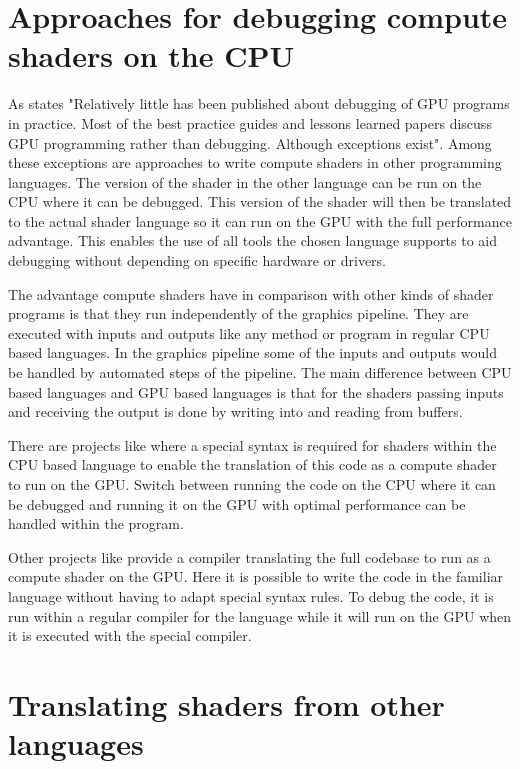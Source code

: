\section{Approaches for debugging compute shaders on the CPU}
\label{section:computeApproaches}

As  states "Relatively little has been published about debugging of GPU programs  in  practice.  Most  of  the  best  practice  guides  and lessons learned papers discuss GPU programming rather than debugging. Although exceptions exist". Among these exceptions are approaches to write compute shaders in other programming languages. The version of the shader in the other language can be run on the CPU where it can be debugged. This version of the shader will then be translated to the actual shader language so it can run on the GPU with the full performance advantage. This enables the use of all tools the chosen language supports to aid debugging without depending on specific hardware or drivers.

The advantage compute shaders have in comparison with other kinds of shader programs is that they run independently of the graphics pipeline. They are executed with inputs and outputs like any method or program in regular CPU based languages. In the graphics pipeline some of the inputs and outputs would be handled by automated steps of the pipeline. The main difference between CPU based languages and GPU based languages is that for the shaders passing inputs and receiving the output is done by writing into and reading from buffers.

There are projects like  where a special syntax is required for shaders within the CPU based language to enable the translation of this code as a compute shader to run on the GPU. Switch between running the code on the CPU where it can be debugged and running it on the GPU with optimal performance can be handled within the program.

Other projects like  provide a compiler translating the full codebase to run as a compute shader on the GPU. Here it is possible to write the code in the familiar language without having to adapt special syntax rules. To debug the code, it is run within a regular compiler for the language while it will run on the GPU when it is executed with the special compiler.

\section{Translating shaders from other languages}\label{section:translating}


